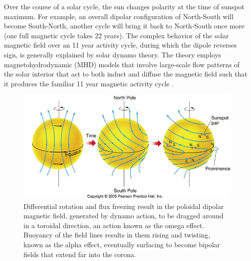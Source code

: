 
Over the course of a solar cycle, the sun changes polarity at the time of sunspot maximum. For example, an overall dipolar configuration of North-South will become South-North, another cycle will bring it back to North-South once more (one full magnetic cycle takes 22 years). The complex behavior of the solar magnetic field over an 11 year activity cycle, during which the dipole reverses sign, is generally explained by solar dynamo theory. The theory employs magnetohydrodynamic (MHD) models that involve large-scale flow patterns of the solar interior that act to both induct and diffuse the magnetic field such that it produces the familiar 11 year magnetic activity cycle \citep{charbon2010}. 

\begin{figure}[!t]
\begin{center}
\includegraphics[]{images/Babcock}
\caption[The Babcock model of magnetic field evolution in the Sun]{Differential rotation and flux freezing result in the poloidal dipolar magnetic field, generated by dynamo action, to be dragged around in a toroidal direction, an action known as the omega effect. Buoyancy of the field lines results in them rising and twisting, known as the alpha effect, eventually surfacing to become bipolar fields that extend far into the corona.}
\label{fig:Babcock} 
\end{center}
\end{figure}

